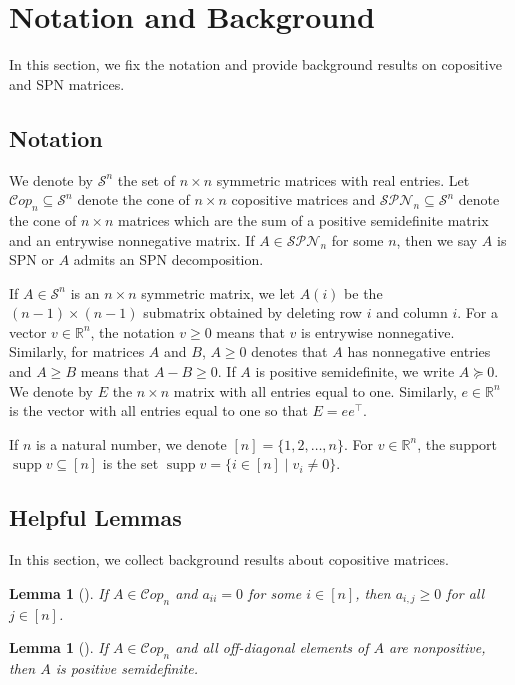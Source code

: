 \documentclass{amsart}
\DeclareMathOperator*{\supp}{supp}
\newcommand{\bbR}{\mathbb{R}}
\newcommand{\cS}{\mathcal{S}}
\newcommand{\Cop}{\mathcal{C}op}
\newcommand{\SPN}{\mathcal{SPN}}
\newtheorem{lemma}[theorem]{Lemma}
\theoremstyle{definition}
\begin{document}
\section{Notation and Background}\label{sec:Background}

In this section, we fix the notation and provide background results on copositive and SPN matrices. 

\subsection{Notation} 

We denote by $\cS^n$ the set of $n\times n$ symmetric matrices with real entries. Let $\Cop_n \subseteq \cS^n$ denote the cone of $n\times n$ copositive matrices and $\SPN_n\subseteq \cS^n$ denote the cone of $n\times n$ matrices which are the sum of a positive semidefinite matrix and an entrywise nonnegative matrix. If $A \in \SPN_n$ for some $n$, then we say $A$ is SPN or $A$ admits an SPN decomposition.

If $A \in \cS^n$ is an $n\times n$ symmetric matrix, we let $A(i)$ be the $(n-1)\times (n-1)$ submatrix obtained by deleting row $i$ and column $i$. For a vector $v \in \bbR^n$, the notation $v \geq 0$ means that $v$ is entrywise nonnegative. Similarly, for matrices $A$ and $B$, $A\geq 0$ denotes that $A$ has nonnegative entries and $A \geq B$ means that $A-B \geq 0$. If $A$ is positive semidefinite, we write $A \succeq 0$. We denote by $E$ the $n\times n$ matrix with all entries equal to one. Similarly, $e \in \bbR^n$ is the vector with all entries equal to one so that $E = ee^\top$.

If $n$ is a natural number, we denote $[n] = \{1,2,\ldots, n\}$. For $v \in \bbR^n$, the support $\supp v \subseteq [n]$ is the set $\supp v = \{i \in [n]\; \vert \; v_i \neq 0\}$. 


\subsection{Helpful Lemmas}

In this section, we collect background results about copositive matrices. 
\begin{lemma}[{\cite[Lemma 2]{diananda1962non}}]\label{lem:diag_elts}
If $A \in \Cop_n$ and $a_{ii} = 0$ for some $i \in [n]$, then $a_{i,j} \geq 0$ for all $j \in [n]$.
\end{lemma}

\begin{lemma}[{\cite[Theorem 4]{ping_criteria_1993}}]\label{lem:NegativePSD}
If $A \in \Cop_n$ and all off-diagonal elements of $A$ are nonpositive, then $A$ is positive semidefinite.
\end{lemma}
\end{document}
